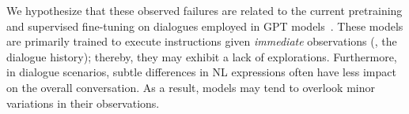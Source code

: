 We hypothesize that these observed failures are related to the current pretraining and supervised fine-tuning on dialogues employed in GPT models~\cite{ouyang2022training}. These models are primarily trained to execute instructions given \emph{immediate} observations (\ie, the dialogue history); thereby, they may exhibit a lack of explorations. 
Furthermore, in dialogue scenarios, subtle differences in NL expressions often have less impact on the overall conversation. As a result, models may tend to overlook minor variations in their observations.


